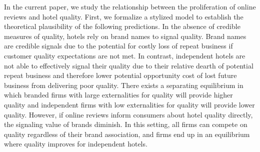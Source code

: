 \documentclass[12pt, leqno]{article}
\begin{document}
In the current paper, we study the relationship between the proliferation of online reviews and hotel quality. First, we formalize a stylized model to establish the theoretical plausibility of the following predictions. In the absence of credible measures of quality, hotels rely on brand names to signal quality. Brand names are credible signals due to the potential for costly loss of repeat business if customer quality expectations are not met. In contrast, independent hotels are not able to effectively signal their quality due to their relative dearth of potential repeat business and therefore lower potential opportunity cost of lost future business from delivering poor quality. There exists a separating equilibrium in which branded firms with large externalities for quality will provide higher quality and independent firms with low externalities for quality will provide lower quality. However, if online reviews inform consumers about hotel quality directly, the signaling value of brands diminish. In this setting, all firms can compete on quality regardless of their brand association, and firms end up in an equilibrium where quality improves for independent hotels. 
\end{document}
